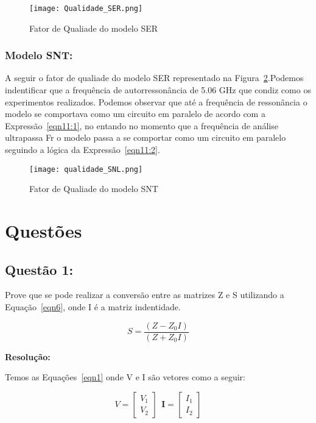\documentclass[a4paper,12pt]{proc}
\begin{document}
\begin{figure}[htbp]
    \centering
    \texttt{[image: Qualidade\_SER.png]}
    \caption{Fator de Qualiade do modelo SER}
    \label{qualidadeSER}
\end{figure}

\subsubsection{Modelo SNT:}

A seguir o fator de qualiade do modelo SER representado na Figura~\ref{qualidadeSNL}.Podemos indentificar que a frequência de autorressonância de 5.06 GHz que condiz como os experimentos realizados. Podemos observar que até a frequência de ressonância o modelo se comportava como um circuito em paralelo de acordo com a Expressão~\ref{eqn11:1}, no entando no momento que a frequência de análise ultrapassa Fr o modelo passa a se comportar como um circuito em paralelo seguindo a lógica da Expressão~\ref{eqn11:2}.

\begin{figure}[htbp]
    \centering
    \texttt{[image: qualidade\_SNL.png]}
    \caption{Fator de Qualiade do modelo SNT}
    \label{qualidadeSNL}
\end{figure}


\section{Questões}
\subsection{Questão 1:}

Prove que se pode realizar a conversão entre as matrizes Z e S utilizando a Equação~\ref{eqn6}, onde I é a matriz indentidade.

\begin{equation}
    S = \frac{(Z - Z_{0}I)}{(Z + Z_{0}I)}
    \label{eqn6}
\end{equation}

\textbf{Resolução:}

\noindent Temos as Equações~\ref{eqn1} onde V e I são vetores como a seguir:

\[V = \begin{bmatrix} V_{1}\\ V_{2} \end{bmatrix}~~ \textbf{I} = \begin{bmatrix} I_{1}\\ I_{2} \end{bmatrix}\]
\end{document}

